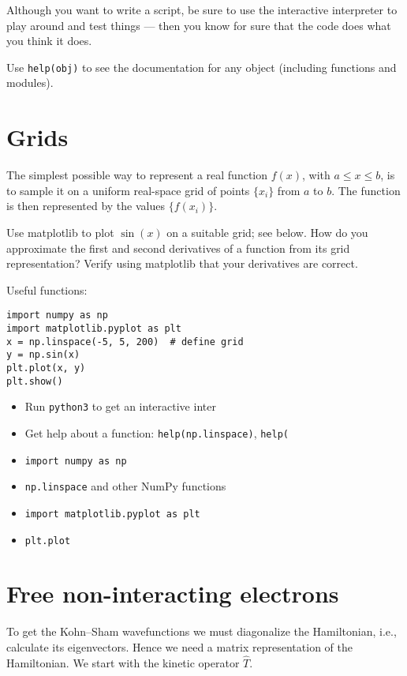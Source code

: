 \documentclass{article}
\begin{document}
Although you want to write a script, be sure to use
the interactive interpreter to play around and test things ---
then you know for sure that the code does what you think it does.

Use \lstinline{help(obj)} to see the documentation for any object
(including functions and modules).

\section{Grids}
The simplest possible way to represent a real function $f(x)$,
with $a \le x \le b$, is to
sample it on a uniform real-space grid of points $\{x_i\}$ from $a$ to $b$.
The function is then represented by the values $\{f(x_i)\}$.

Use matplotlib to plot $\sin(x)$ on a suitable grid; see below.  How
do you approximate the first and second derivatives of a function from
its grid representation?  Verify using matplotlib that your
derivatives are correct.

Useful functions:

\begin{lstlisting}
import numpy as np
import matplotlib.pyplot as plt
x = np.linspace(-5, 5, 200)  # define grid
y = np.sin(x)
plt.plot(x, y)
plt.show()
\end{lstlisting}



\begin{itemize}
\item Run \texttt{python3} to get an interactive inter
\item Get help about a function: \texttt{help(np.linspace)}, \texttt{help(}
\item \texttt{import numpy as np}
\item \texttt{np.linspace} and other NumPy functions
\item \texttt{import matplotlib.pyplot as plt}
\item \texttt{plt.plot}
\end{itemize}

\section{Free non-interacting electrons}

To get the Kohn--Sham wavefunctions we must diagonalize the
Hamiltonian, i.e., calculate its eigenvectors.  Hence we need a matrix
representation of the Hamiltonian.  We start with the kinetic operator
$\hat T$.
\end{document}

